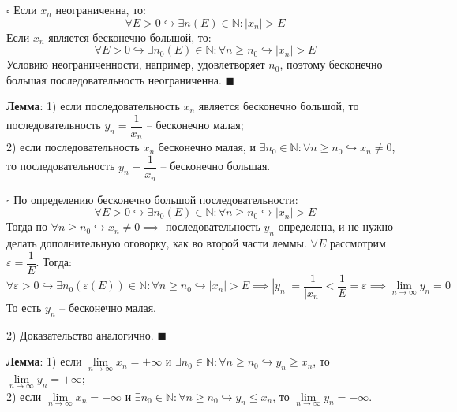 \documentclass[12pt, a4paper, reqno]{article}
\begin{document}
    $\square$ Если $x_n$ неограниченна, то:
    \begin{equation*}
        \forall E > 0 \hookrightarrow \exists n(E)\in\mathbb{N}: |x_n| > E
    \end{equation*}
    Если $x_n$ является бесконечно большой, то:
    \begin{equation*}
        \forall E > 0 \hookrightarrow \exists n_0(E)\in\mathbb{N}: \forall n \geq n_0
        \hookrightarrow |x_n| > E
    \end{equation*}
    Условию неограниченности, например, удовлетворяет $n_0$, поэтому бесконечно большая
    последовательность неограниченна. $\blacksquare$

    \textbf{Лемма}: 1) если последовательность $x_n$ является бесконечно большой, то
    последовательность $y_n = \dfrac{1}{x_n}$ -- бесконечно малая;\\
    2) если последовательность $x_n$ бесконечно малая, и $\exists n_0\in\mathbb{N}: \forall n \geq
    n_0 \hookrightarrow x_n \neq 0$, то последовательность $y_n = \dfrac{1}{x_n}$ -- бесконечно
    большая.

    $\square$ По определению бесконечно большой последовательности:
    \begin{equation*}
        \forall E > 0 \hookrightarrow \exists n_0(E)\in\mathbb{N}: \forall n \geq n_0
        \hookrightarrow |x_n| > E
    \end{equation*}
    Тогда по $\forall n \geq n_0 \hookrightarrow x_n \neq 0 \implies$ последовательность $y_n$
    определена, и не нужно делать дополнительную оговорку, как во второй части леммы. $\forall E$
    рассмотрим $\varepsilon = \dfrac{1}{E}$. Тогда:
    \begin{equation*}
        \forall \varepsilon > 0 \hookrightarrow \exists n_0(\varepsilon(E))\in\mathbb{N}: \forall n
        \geq n_0 \hookrightarrow |x_n| > E \implies |y_n| = \dfrac{1}{|x_n|} < \dfrac{1}{E} =
        \varepsilon \implies \lim\limits_{n\to\infty} y_n = 0
    \end{equation*}
    То есть $y_n$ -- бесконечно малая.

    2) Доказательство аналогично. $\blacksquare$

    \textbf{Лемма}: 1) если $\lim\limits_{n\to\infty} x_n = +\infty$ и $\exists n_0\in\mathbb{N}:
    \forall n \geq n_0 \hookrightarrow y_n \geq x_n$, то $\lim\limits_{n\to\infty} y_n = +\infty$;\\
    2) если $\lim\limits_{n\to\infty} x_n = -\infty$ и $\exists n_0\in\mathbb{N}: \forall n \geq
    n_0 \hookrightarrow y_n \leq x_n$, то $\lim\limits_{n\to\infty} y_n = -\infty$.
\end{document}

